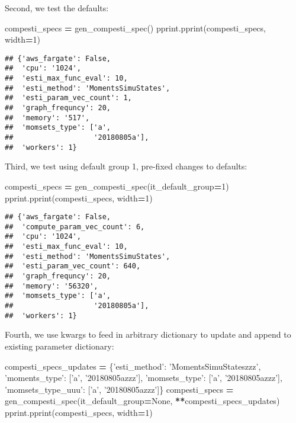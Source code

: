 \documentclass[
]{book}
\newenvironment{Shaded}{\begin{snugshade}}{\end{snugshade}}
\newcommand{\DecValTok}[1]{\textcolor[rgb]{0.00,0.00,0.81}{#1}}
\newcommand{\NormalTok}[1]{#1}
\newcommand{\OperatorTok}[1]{\textcolor[rgb]{0.81,0.36,0.00}{\textbf{#1}}}
\newcommand{\StringTok}[1]{\textcolor[rgb]{0.31,0.60,0.02}{#1}}
\newcommand{\VariableTok}[1]{\textcolor[rgb]{0.00,0.00,0.00}{#1}}
\begin{document}
Second, we test the defaults:

\begin{Shaded}
\begin{Highlighting}[]
\NormalTok{compesti_specs }\OperatorTok{=}\NormalTok{ gen_compesti_spec()}
\NormalTok{pprint.pprint(compesti_specs, width}\OperatorTok{=}\DecValTok{1}\NormalTok{)}
\end{Highlighting}
\end{Shaded}

\begin{verbatim}
## {'aws_fargate': False,
##  'cpu': '1024',
##  'esti_max_func_eval': 10,
##  'esti_method': 'MomentsSimuStates',
##  'esti_param_vec_count': 1,
##  'graph_frequncy': 20,
##  'memory': '517',
##  'momsets_type': ['a',
##                   '20180805a'],
##  'workers': 1}
\end{verbatim}

Third, we test using default group 1, pre-fixed changes to defaults:

\begin{Shaded}
\begin{Highlighting}[]
\NormalTok{compesti_specs }\OperatorTok{=}\NormalTok{ gen_compesti_spec(it_default_group}\OperatorTok{=}\DecValTok{1}\NormalTok{)}
\NormalTok{pprint.pprint(compesti_specs, width}\OperatorTok{=}\DecValTok{1}\NormalTok{)}
\end{Highlighting}
\end{Shaded}

\begin{verbatim}
## {'aws_fargate': False,
##  'compute_param_vec_count': 6,
##  'cpu': '1024',
##  'esti_max_func_eval': 10,
##  'esti_method': 'MomentsSimuStates',
##  'esti_param_vec_count': 640,
##  'graph_frequncy': 20,
##  'memory': '56320',
##  'momsets_type': ['a',
##                   '20180805a'],
##  'workers': 1}
\end{verbatim}

Fourth, we use kwargs to feed in arbitrary dictionary to update and append to existing parameter dictionary:

\begin{Shaded}
\begin{Highlighting}[]
\NormalTok{compesti_specs_updates }\OperatorTok{=}\NormalTok{ \{}\StringTok{'esti_method'}\NormalTok{: }\StringTok{'MomentsSimuStateszzz'}\NormalTok{,}
                          \StringTok{'moments_type'}\NormalTok{: [}\StringTok{'a'}\NormalTok{, }\StringTok{'20180805azzz'}\NormalTok{],}
                          \StringTok{'momsets_type'}\NormalTok{: [}\StringTok{'a'}\NormalTok{, }\StringTok{'20180805azzz'}\NormalTok{],}
                          \StringTok{'momsets_type_uuu'}\NormalTok{: [}\StringTok{'a'}\NormalTok{, }\StringTok{'20180805azzz'}\NormalTok{]\}}
\NormalTok{compesti_specs }\OperatorTok{=}\NormalTok{ gen_compesti_spec(it_default_group}\OperatorTok{=}\VariableTok{None}\NormalTok{, }\OperatorTok{**}\NormalTok{compesti_specs_updates)}
\NormalTok{pprint.pprint(compesti_specs, width}\OperatorTok{=}\DecValTok{1}\NormalTok{)}
\end{Highlighting}
\end{Shaded}
\end{document}
